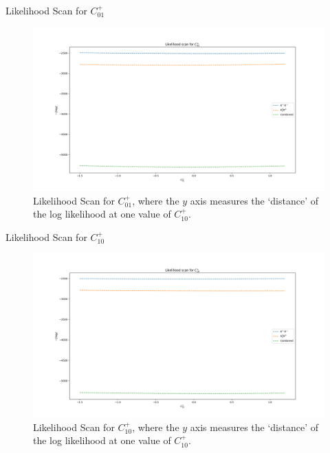 \begin{frame}{Likelihood Scan for $C_{01}^{+}$}
\begin{figure}
    \centering
        \includegraphics[width=\textwidth]{2020_04_23/figs/P01.png}
    \caption{Likelihood Scan for $C_{01}^{+}$, where the $y$ axis measures the `distance' of the log likelihood at one value of $C_{10}^{+}$.}
    \label{fig:scanCP01}
\end{figure}
\end{frame}

\begin{frame}{Likelihood Scan for $C_{10}^{+}$}
\begin{figure}
    \centering
        \includegraphics[width=\textwidth]{2020_04_23/figs/P10.png}
    \caption{Likelihood Scan for $C_{10}^{+}$, where the $y$ axis measures the `distance' of the log likelihood at one value of $C_{10}^{+}$.}
    \label{fig:scanCP10}
\end{figure}
\end{frame}

